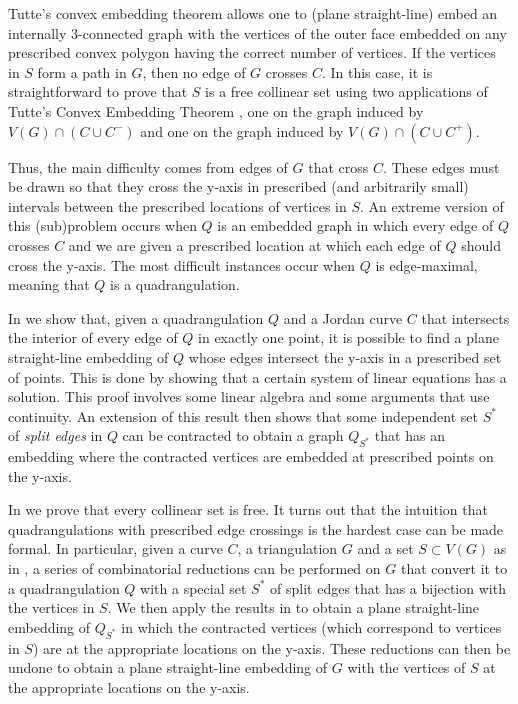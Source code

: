 \documentclass{patmorin}
\begin{document}
Tutte's convex embedding theorem \cite{tutte:how} allows one to (plane
straight-line) embed an internally 3-connected graph with the vertices
of the outer face embedded on any prescribed convex polygon having the
correct number of vertices.  If the vertices in $S$ form a path in $G$,
then no edge of $G$ crosses $C$. In this case, it is straightforward to
prove that $S$ is a free collinear set using two applications of Tutte's
Convex Embedding Theorem \cite{tutte:how}, one on the graph induced by
$V(G)\cap(C\cup C^-)$ and one on the graph induced by $V(G)\cap(C\cup
C^+)$.

Thus, the main difficulty comes from edges of $G$ that cross $C$.
These edges must be drawn so that they cross the y-axis in prescribed
(and arbitrarily small) intervals between the prescribed locations of vertices
in $S$.  An extreme version of this (sub)problem occurs when $Q$ is an
embedded graph in which every edge of $Q$ crosses $C$ and we are given a
prescribed location at which each edge of $Q$ should cross the y-axis.
The most difficult instances occur when $Q$ is edge-maximal, meaning
that $Q$ is a quadrangulation.

In  we show that, given a quadrangulation $Q$
and a Jordan curve $C$ that intersects the interior of every edge of
$Q$ in exactly one point, it is possible to find a plane straight-line
embedding of $Q$ whose edges intersect the y-axis in a prescribed set
of points.  This is done by showing that a certain system of linear
equations has a solution. This proof involves some linear algebra and
some arguments that use continuity.  An extension of this result then
shows that some independent set $S^*$ of \emph{split edges} in $Q$ can
be contracted to obtain a graph $Q_{S^*}$ that has an embedding where
the contracted vertices are embedded at prescribed points on the y-axis.

In  we prove that every collinear set is free.
It turns out that the intuition that quadrangulations with prescribed
edge crossings is the hardest case can be made formal. In particular,
given a curve $C$, a triangulation $G$ and a set $S\subset V(G)$ as
in , a series of combinatorial reductions can be
performed on $G$ that convert it to a quadrangulation $Q$ with a special
set $S^*$ of split edges that has a bijection with the vertices in $S$.
We then apply the results in  to obtain a plane
straight-line embedding of $Q_{S^*}$ in which the contracted vertices
(which correspond to vertices in $S$) are at the appropriate locations
on the y-axis. These reductions can then be undone to obtain a plane
straight-line embedding of $G$ with the vertices of $S$ at the appropriate
locations on the y-axis.
\end{document}
